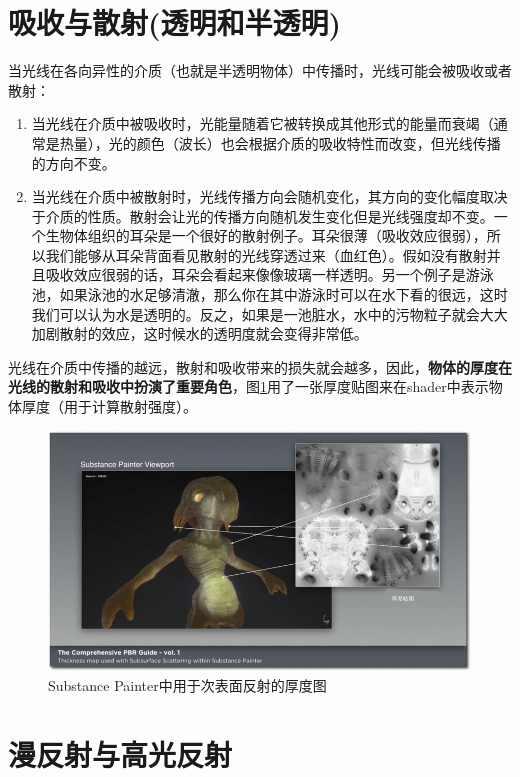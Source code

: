 \section{吸收与散射(透明和半透明)}

当光线在各向异性的介质（也就是半透明物体）中传播时，光线可能会被吸收或者散射：

\begin{enumerate}
\item 当光线在介质中被吸收时，光能量随着它被转换成其他形式的能量而衰竭（通常是热量），光的颜色（波长）也会根据介质的吸收特性而改变，但光线传播的方向不变。
\item 当光线在介质中被散射时，光线传播方向会随机变化，其方向的变化幅度取决于介质的性质。散射会让光的传播方向随机发生变化但是光线强度却不变。一个生物体组织的耳朵是一个很好的散射例子。耳朵很薄（吸收效应很弱），所以我们能够从耳朵背面看见散射的光线穿透过来（血红色）。假如没有散射并且吸收效应很弱的话，耳朵会看起来像像玻璃一样透明。另一个例子是游泳池，如果泳池的水足够清澈，那么你在其中游泳时可以在水下看的很远，这时我们可以认为水是透明的。反之，如果是一池脏水，水中的污物粒子就会大大加剧散射的效应，这时候水的透明度就会变得非常低。
\end{enumerate}

光线在介质中传播的越远，散射和吸收带来的损失就会越多，因此，\textbf{物体的厚度在光线的散射和吸收中扮演了重要角色}，图\ref{fig:chap1_2}用了一张厚度贴图来在shader中表示物体厚度（用于计算散射强度）。

\begin{figure}[ht]
    \centering
	\includegraphics[width=\textwidth]{images/chap1_2.jpg}
	\caption{Substance Painter中用于次表面反射的厚度图}
    \label{fig:chap1_2}
\end{figure}

\section{漫反射与高光反射}

